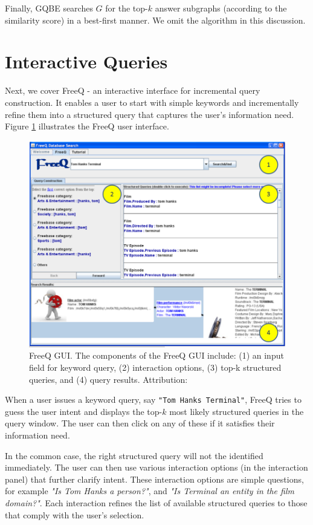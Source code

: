 \documentclass[a4paper, twoside, 12pt]{report}
\begin{document}
 Finally, GQBE searches $G$ for the top-$k$ answer subgraphs (according to the similarity score) in a best-first manner. We omit the algorithm in this discussion.

 \section{Interactive Queries}

 Next, we cover FreeQ \cite{demidova2012freeq} - an interactive interface for incremental query construction. It enables a user to start with simple keywords and incrementally refine them into a structured query that captures the user's information need. Figure \ref{fig:freeq} illustrates the FreeQ user interface.

 \begin{figure}[h!]
 \includegraphics[scale=0.45]{freeq.png}
 \caption{FreeQ GUI. The components of the FreeQ
GUI include: (1) an input field for keyword query,
(2) interaction options, (3) top-k structured queries,
and (4) query results. Attribution: \cite{demidova2012freeq}}
 \label{fig:freeq}
 \end{figure}

 When a user issues a keyword query, say \texttt{"Tom Hanks Terminal"}, FreeQ tries to guess the user intent and displays the top-$k$ most likely structured queries in the query window. The user can then click on any of these if it satisfies their information need.

 In the common case, the right structured query will not the identified immediately. The user can then use various interaction options (in the interaction panel) that further clarify intent. These interaction options are simple questions, for example \emph{"Is Tom Hanks a person?"}, and \emph{"Is Terminal an entity in the film domain?"}. Each interaction refines the list of available structured queries to those that comply with the user's selection.
\end{document}
